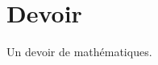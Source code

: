 \documentclass{article}
\begin{document}
\section{Devoir}
Un devoir de mathématiques.

\end{document}
